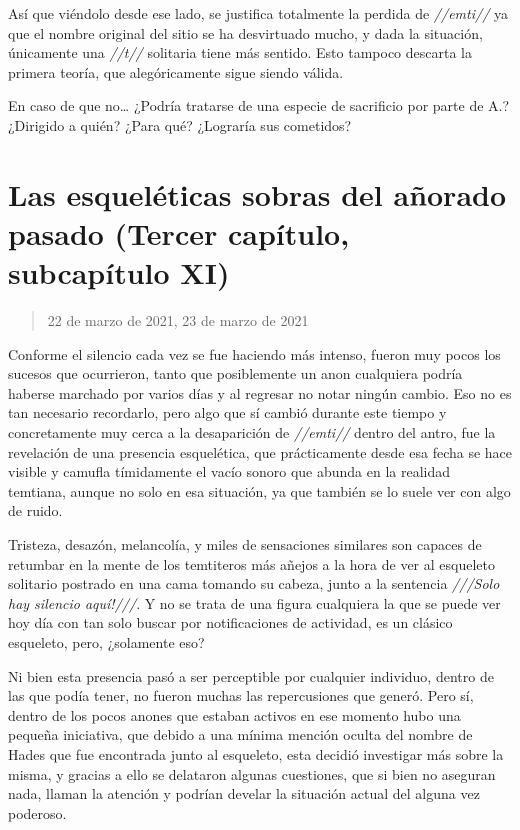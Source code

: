 \documentclass[
  spanish,
]{book}
\begin{document}
Así que viéndolo desde ese lado, se justifica totalmente la perdida de \emph{//emti//} ya que el nombre original del sitio se ha desvirtuado mucho, y dada la situación, únicamente una \emph{//t//} solitaria tiene más sentido. Esto tampoco descarta la primera teoría, que alegóricamente sigue siendo válida.

En caso de que no\ldots{} ¿Podría tratarse de una especie de sacrificio por parte de A.? ¿Dirigido a quién? ¿Para qué? ¿Lograría sus cometidos?

\hypertarget{las-esqueluxe9ticas-sobras-del-auxf1orado-pasado-tercer-capuxedtulo-subcapuxedtulo-xi}{%
\section{Las esqueléticas sobras del añorado pasado (Tercer capítulo, subcapítulo XI)}\label{las-esqueluxe9ticas-sobras-del-auxf1orado-pasado-tercer-capuxedtulo-subcapuxedtulo-xi}}

\begin{quote}
22 de marzo de 2021, 23 de marzo de 2021
\end{quote}

Conforme el silencio cada vez se fue haciendo más intenso, fueron muy pocos los sucesos que ocurrieron, tanto que posiblemente un anon cualquiera podría haberse marchado por varios días y al regresar no notar ningún cambio. Eso no es tan necesario recordarlo, pero algo que sí cambió durante este tiempo y concretamente muy cerca a la desaparición de \emph{//emti//} dentro del antro, fue la revelación de una presencia esquelética, que prácticamente desde esa fecha se hace visible y camufla tímidamente el vacío sonoro que abunda en la realidad temtiana, aunque no solo en esa situación, ya que también se lo suele ver con algo de ruido.

Tristeza, desazón, melancolía, y miles de sensaciones similares son capaces de retumbar en la mente de los temtiteros más añejos a la hora de ver al esqueleto solitario postrado en una cama tomando su cabeza, junto a la sentencia \emph{///Solo hay silencio aquí!///}. Y no se trata de una figura cualquiera la que se puede ver hoy día con tan solo buscar por notificaciones de actividad, es un clásico esqueleto, pero, ¿solamente eso?

Ni bien esta presencia pasó a ser perceptible por cualquier individuo, dentro de las que podía tener, no fueron muchas las repercusiones que generó. Pero sí, dentro de los pocos anones que estaban activos en ese momento hubo una pequeña iniciativa, que debido a una mínima mención oculta del nombre de Hades que fue encontrada junto al esqueleto, esta decidió investigar más sobre la misma, y gracias a ello se delataron algunas cuestiones, que si bien no aseguran nada, llaman la atención y podrían develar la situación actual del alguna vez poderoso.
\end{document}
